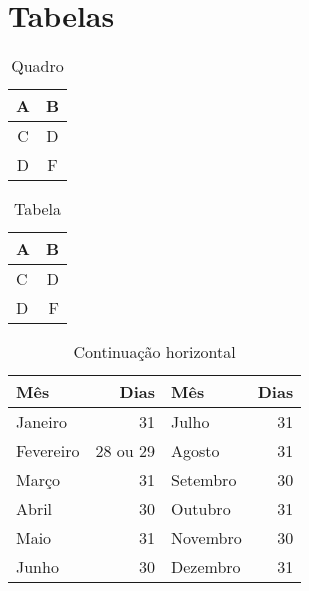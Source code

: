 \documentclass[12pt]{article}   %
\begin{document}
	\section{Tabelas}

		\begin{table}[h!]
			\centering
			\caption{Quadro}
			\label{tab_quadro}
			\begin{tabular}{|c|c|}
				\hline
				A & B \\
				\hline
				C & D \\
				\hline
				D & F \\
				\hline
			\end{tabular}
		\end{table}

		\begin{table}[h!]
			\centering
			\caption{Tabela}
			\label{tab_tabela}
			\begin{tabular}{lr}
				\hline
				A & B \\
				\hline
				C & D \\
				\hline
				D & F \\
				\hline
			\end{tabular}
		\end{table}

	 	\begin{table}[h!]
	 		\centering
	 		\caption{Continuação horizontal}
	 		\label{tab_mes}
	 		\begin{tabular}{l|r||l|r}
	 			\hline
	 			Mês&Dias&Mês&Dias\\
	 			\hline
	 			Janeiro&31&Julho&31\\
	 			Fevereiro&28 ou 29&Agosto&31\\
	 			Março&31&Setembro&30\\
	 			Abril&30&Outubro&31\\
	 			Maio&31&Novembro&30\\
	 			Junho&30&Dezembro&31\\
	 			\hline
	 		\end{tabular}
	 	\end{table}
\end{document}
